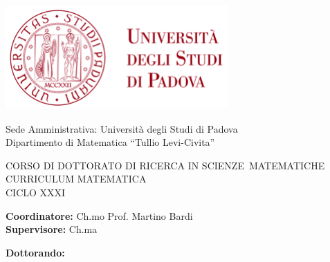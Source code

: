 
\begin{titlepage}
  \begin{addmargin}[-1cm]{-3cm}
    \begin{center}
      \includegraphics{gfx/logo-unipd-color}
    \end{center}
    \medskip
    \large

    \begin{flushleft}
      Sede Amministrativa: Università degli Studi di Padova\\
      \vspace{0.5cm}
      Dipartimento di Matematica ``Tullio Levi-Civita''
    \end{flushleft}

    \medskip
    \begin{flushleft}
      CORSO DI DOTTORATO DI RICERCA IN SCIENZE~MATEMATICHE\\
      \medskip
      CURRICULUM MATEMATICA\\
      \medskip
      CICLO XXXI
    \end{flushleft}
    \vspace{3.7cm}

    \LARGE
    \begin{center}\spacedallcaps{\myTitle}
    \end{center}
    \large



    \vspace{3.7cm}
    \begin{flushleft}
      \textbf{Coordinatore:} Ch.mo Prof. Martino Bardi\\
      \medskip
      \textbf{Supervisore:} Ch.ma \myProf
      \medskip
    \end{flushleft}
    \medskip
    \begin{flushright}
      \textbf{Dottorando:} \myName
      \medskip
    \end{flushright}
    \normalsize


  \end{addmargin}

\end{titlepage}
